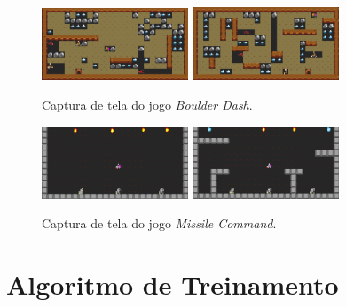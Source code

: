 \begin{figure}[h]
  \centering
  \subfigure
  {
    \includegraphics[width=0.39\textwidth]{./fig/gvgai-boulderdash-lvl0-v0}
    \label{subfig:boulderdash1}
  } 
  \subfigure
  {
    \includegraphics[width=0.39\textwidth]{./fig/gvgai-boulderdash-lvl2-v0}
    \label{subfig:boulderdash3}
  }
  \caption{Captura de tela do jogo \textit{Boulder Dash}.}
  \label{fig:boulderdash}
\end{figure}


\begin{figure}[h]
  \centering
  \subfigure
  {
    \includegraphics[width=0.39\textwidth]{./fig/gvgai-missilecommand-lvl0-v0}
    \label{subfig:missilecommand1}
  } 
  \subfigure
  {
    \includegraphics[width=0.39\textwidth]{./fig/gvgai-missilecommand-lvl2-v0}
    \label{subfig:missilecommand3}
  }
  \caption{Captura de tela do jogo \textit{Missile Command}.}
  \label{fig:missilecommand}
\end{figure}

\section{Algoritmo de Treinamento}

